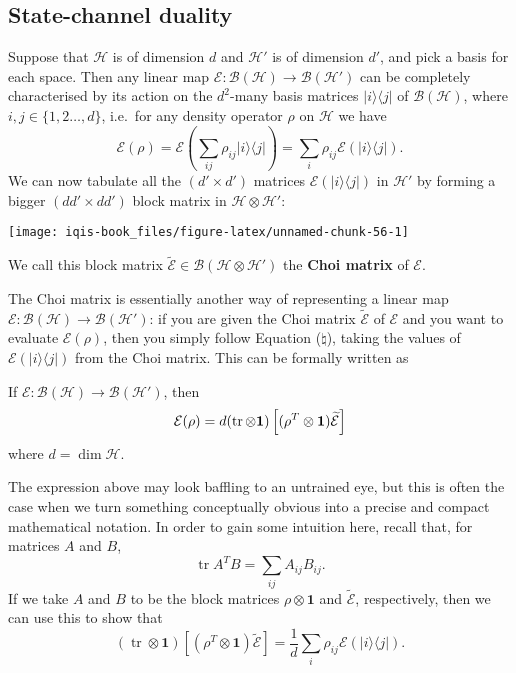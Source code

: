 \documentclass[fleqn]{article}
\newenvironment{idea}{\noindent}{\medskip}
\begin{document}
\hypertarget{state-channel-duality}{%
\subsection{State-channel duality}\label{state-channel-duality}}

Suppose that \(\mathcal{H}\) is of dimension \(d\) and \(\mathcal{H}'\) is of dimension \(d'\), and pick a basis for each space.
Then any linear map \(\mathcal{E}\colon\mathcal{B}(\mathcal{H})\to\mathcal{B}(\mathcal{H'})\) can be completely characterised by its action on the \(d^2\)-many basis matrices \(|i\rangle\langle j|\) of \(\mathcal{B}(\mathcal{H})\), where \(i,j\in\{1,2\ldots,d\}\), i.e.~for any density operator \(\rho\) on \(\mathcal{H}\) we have
\[
  \mathcal{E}(\rho)
  = \mathcal{E}\left(\sum_{ij}\rho_{ij} |i\rangle\langle j|\right)
  = \sum_i\rho_{ij}\mathcal{E}(|i\rangle\langle j|).
\tag{$\natural$}
\]
We can now tabulate all the \((d'\times d')\) matrices \(\mathcal{E}(|i\rangle\langle j|)\) in \(\mathcal{H}'\) by forming a bigger \((dd'\times dd')\) block matrix in \(\mathcal{H}\otimes\mathcal{H}'\):

\begin{center}\texttt{[image: iqis-book\_files/figure-latex/unnamed-chunk-56-1]} \end{center}

We call this block matrix \(\widetilde{\mathcal{E}}\in\mathcal{B}(\mathcal{H}\otimes\mathcal{H}')\) the \textbf{Choi matrix} of \(\mathcal{E}\).

The Choi matrix is essentially another way of representing a linear map \(\mathcal{E}\colon\mathcal{B}(\mathcal{H})\to\mathcal{B}(\mathcal{H'})\): if you are given the Choi matrix \(\widetilde{\mathcal{E}}\) of \(\mathcal{E}\) and you want to evaluate \(\mathcal{E}(\rho)\), then you simply follow Equation (\(\natural\)), taking the values of \(\mathcal{E}(|i\rangle\langle j|)\) from the Choi matrix.
This can be formally written as

\begin{idea}
If \(\mathcal{E}\colon\mathcal{B}(\mathcal{H})\to\mathcal{B}(\mathcal{H'})\), then
\[
  \mathcal{E}(\rho)
  = d(\operatorname{tr}\otimes\mathbf{1})\left[(\rho^T\otimes\mathbf{1})\widetilde{\cal{E}}\right]
\]
where \(d=\dim\mathcal{H}\).

\end{idea}

The expression above may look baffling to an untrained eye, but this is often the case when we turn something conceptually obvious into a precise and compact mathematical notation.
In order to gain some intuition here, recall that, for matrices \(A\) and \(B\),
\[
  \operatorname{tr}A^T B = \sum_{ij} A_{ij}B_{ij}.
\]
If we take \(A\) and \(B\) to be the block matrices \(\rho\otimes\mathbf{1}\) and \(\widetilde{\mathcal{E}}\), respectively, then we can use this to show that
\[
  (\operatorname{tr}\otimes\mathbf{1})\left[(\rho^T\otimes\mathbf{1})\widetilde{\mathcal{E}}\right]
  = \frac{1}{d}\sum_i\rho_{ij}\mathcal{E}(|i\rangle\langle j|).
\]
\end{document}
